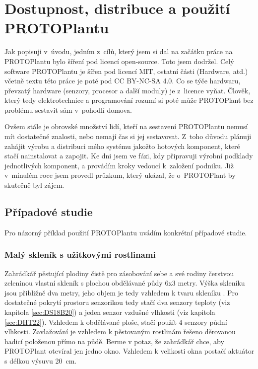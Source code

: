 \chapter{Dostupnost, distribuce a použití PROTOPlantu}
Jak popisuji v~úvodu, jedním z~cílů, který jsem si dal na začátku práce na PROTOPlantu bylo šíření pod licencí open-source.
Toto jsem dodržel. 
Celý software PROTOPlantu je šířen pod licencí MIT, ostatní části (Hardware, atd.) včetně textu této práce je poté pod CC BY-NC-SA 4.0.
Co se týče hardwaru, převzatý hardware (senzory, procesor a další moduly) je z~licence vyňat.
Člověk, který tedy elektrotechnice a programování rozumí si poté může PROTOPlant bez problému sestavit sám v~pohodlí domova.

Ovšem stále je obrovské množství lidí, kteří na sestavení PROTOPlantu nemusí mít dostatečné znalosti, nebo nemají čas si jej sestavovat.
Z~toho důvodu plánuji zahájit výrobu a distribuci mého systému jakožto hotových komponent, které stačí nainstalovat a zapojit.
Ke dni  jsem ve fázi, kdy připravuji výrobní podklady jednotlivých komponent, a provádím kroky vedoucí k~založení podniku.
Již v~minulém roce jsem provedl průzkum, který ukázal, že o~PROTOPlant by skutečně byl zájem.

\section{Případové studie}
Pro názorný příklad použití PROTOPlantu uvádím konkrétní případové studie.

\subsection{Malý skleník s užitkovými rostlinami}
Zahrádkář pěstující plodiny čistě pro zásobování sebe a své rodiny čerstvou zeleninou vlastní skleník s plochou obdělávané půdy 6x3 metry.
Výška skleníku jsou přibližně dva metry, jeho objem je tedy vzhledem k tvaru skleníku .
Pro dostatečné pokrytí prostoru senzorikou tedy stačí dva senzory teploty (viz kapitola \ref{sec:DS18B20}) a jeden senzor vzdušné vlhkosti (viz kapitola \ref{sec:DHT22}). 
Vzhledem k obdělávané ploše, stačí použít 4 senzory půdní vlhkosti.
Zavlažování je vzhledem k pěstovaným rostlinám řešeno děrovanou hadicí položenou přímo na půdě.
Berme v potaz, že zahrádkář chce, aby PROTOPlant otevíral jen jedno okno.
Vzhledem k velikosti okna postačí aktuátor s délkou výsuvu 20~cm.


